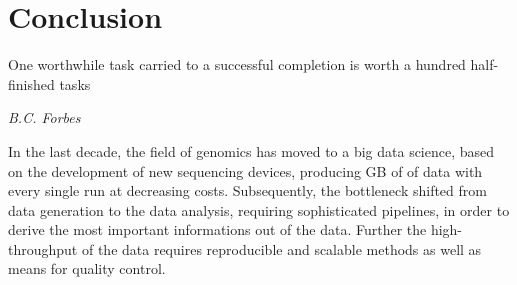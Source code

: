 \chapter{Conclusion}
\label{chap:conclusion}

\epigraph{One worthwhile task carried to a successful completion is worth a hundred half-finished tasks}{\textit{B.C. Forbes}}

In the last decade, the  field of genomics has moved to a big data science, based on the development of new sequencing devices, producing GB of of data with every single run at decreasing costs. Subsequently, the bottleneck shifted from data generation to the data analysis, requiring sophisticated pipelines, in order to derive the most important informations out of the data. Further the high-throughput of the data requires reproducible and scalable methods as well as means for quality control. 

